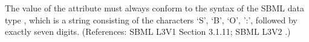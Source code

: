 The value of the attribute  must always conform to the
syntax of the SBML data type , which is a string consisting
of the characters `S', `B', `O', ':', followed by exactly seven digits.
(References: SBML L3V1 Section 3.1.11; SBML L3V2 .)
